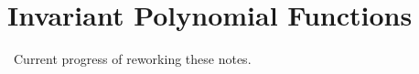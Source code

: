 \chapter{Invariant Polynomial Functions}








\noindent\hrulefill \, Current progress of reworking these notes. \hrulefill










